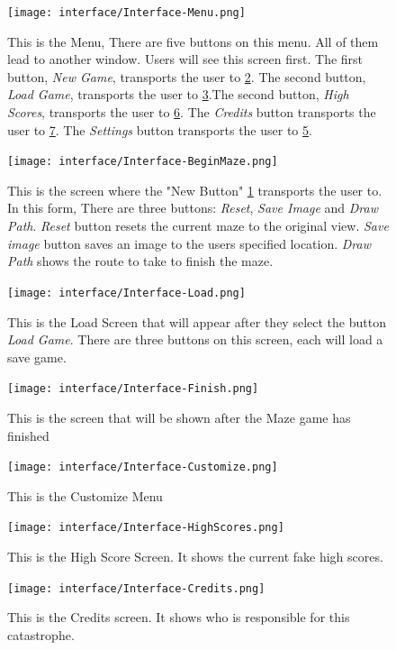 \documentclass[10pt,conference,onecolumn,compsoc]{IEEEtran}
\begin{document}
\begin{center}
\begin{figure}[ht!]
\texttt{[image: interface/Interface-Menu.png]}
\caption{This is the Menu, There are five buttons on this menu. All of them lead to another window. Users will see this screen first. The first button, \textit{New Game}, transports the user to \ref{Start of Maze}. The second button, \textit{Load Game}, transports the user to \ref{Load}.The second button, \textit{High Scores}, transports the user to \ref{High Scores}. The \textit{Credits} button transports the user to \ref{Credits}. The \textit{Settings} button transports the user to \ref{Settings}.}
\label{Menu}
\end{figure}

\begin{figure}[ht!]
\texttt{[image: interface/Interface-BeginMaze.png]}
\caption{This is the screen where the "New Button" \ref{Menu} transports the user to. In this form, There are three buttons: \textit{Reset}, \textit{Save Image} and \textit{Draw Path}. \textit{Reset} button resets the current maze to the original view. \textit{Save image} button saves an image to the users specified location. \textit{Draw Path} shows the route to take to finish the maze.}
\label{Start of Maze}
\end{figure}
\begin{figure}[ht!]
\texttt{[image: interface/Interface-Load.png]}
\caption{This is the Load Screen that will appear after they select the button \textit{Load Game}. There are three buttons on this screen, each will load a save game.}
\label{Load}
\end{figure}
\begin{figure}[ht!]
\texttt{[image: interface/Interface-Finish.png]}
\caption{This is the screen that will be shown after the Maze game has finished}
\label{Finish Screen}
\end{figure}
\begin{figure}[ht!]
\texttt{[image: interface/Interface-Customize.png]}
\caption{This is the Customize Menu}
\label{Settings}
\end{figure}
\begin{figure}[ht!]
\texttt{[image: interface/Interface-HighScores.png]}
\caption{This is the High Score Screen. It shows the current fake high scores.}
\label{High Scores}
\end{figure}
\begin{figure}[ht!]
\texttt{[image: interface/Interface-Credits.png]}
\caption{This is the Credits screen. It shows who is responsible for this catastrophe.}
\label{Credits}
\end{figure}
\end{center}
\clearpage
\end{document}
